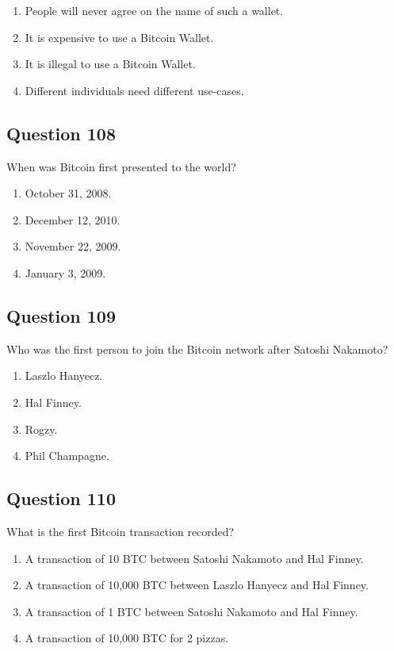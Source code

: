 \documentclass[12pt,a4paper]{article}
\begin{document}
\begin{enumerate}[label=\Alph*., leftmargin=*]
\item People will never agree on the name of such a wallet.
\item It is expensive to use a Bitcoin Wallet.
\item It is illegal to use a Bitcoin Wallet.
\item Different individuals need different use-cases.
\end{enumerate}

\bigskip


\subsection*{Question 108}
When was Bitcoin first presented to the world?

\begin{enumerate}[label=\Alph*., leftmargin=*]
\item October 31, 2008.
\item December 12, 2010.
\item November 22, 2009.
\item January 3, 2009.
\end{enumerate}

\bigskip


\subsection*{Question 109}
Who was the first person to join the Bitcoin network after Satoshi Nakamoto?

\begin{enumerate}[label=\Alph*., leftmargin=*]
\item Laszlo Hanyecz.
\item Hal Finney.
\item Rogzy.
\item Phil Champagne.
\end{enumerate}

\bigskip


\subsection*{Question 110}
What is the first Bitcoin transaction recorded?

\begin{enumerate}[label=\Alph*., leftmargin=*]
\item A transaction of 10 BTC between Satoshi Nakamoto and Hal Finney.
\item A transaction of 10,000 BTC between Laszlo Hanyecz and Hal Finney.
\item A transaction of 1 BTC between Satoshi Nakamoto and Hal Finney.
\item A transaction of 10,000 BTC for 2 pizzas.
\end{enumerate}
\end{document}
